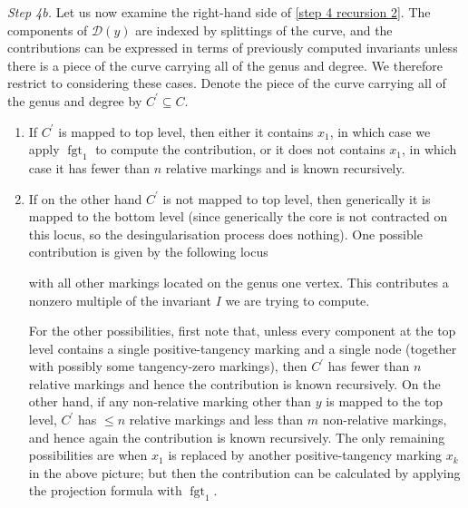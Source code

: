 \documentclass[11pt]{amsart}
\newcommand{\fgt}{\operatorname{fgt}}
\newcommand{\Dcal}{\mathcal{D}}
\theoremstyle{definition}
\theoremstyle{definition}
\begin{document}
\noindent \emph{Step 4b.} Let us now examine the right-hand side of \eqref{step 4 recursion 2}. The components of $\Dcal(y)$ are indexed by splittings of the curve, and the contributions can be expressed in terms of previously computed invariants unless there is a piece of the curve carrying all of the genus and degree. We therefore restrict to considering these cases. Denote the piece of the curve carrying all of the genus and degree by $C^\prime\subseteq C$.
\begin{enumerate}
\item If $C^\prime$ is mapped to top level, then either it contains $x_1$, in which case we apply $\fgt_1$ to compute the contribution, or it does not contains $x_1$, in which case it has fewer than $n$ relative markings and is known recursively. 
\item  If on the other hand $C^\prime$ is not mapped to top level, then generically it is mapped to the bottom level (since generically the core is not contracted on this locus, so the desingularisation process does nothing). One possible contribution is given by the following locus
\begin{center}
\end{center}
with all other markings located on the genus one vertex. This contributes a nonzero multiple of the invariant $I$ we are trying to compute.

For the other possibilities, first note that, unless every component at the top level contains a single positive-tangency marking and a single node (together with possibly some tangency-zero markings), then $C^\prime$ has fewer than $n$ relative markings and hence the contribution is known recursively. On the other hand, if any non-relative marking other than $y$ is mapped to the top level, $C^\prime$ has $\leq n$ relative markings and less than $m$ non-relative markings, and hence again the contribution is known recursively. The only remaining possibilities are when $x_1$ is replaced by another positive-tangency marking $x_k$ in the above picture; but then the contribution can be calculated by applying the projection formula with $\fgt_{1}$.
\end{enumerate}
\end{document}
